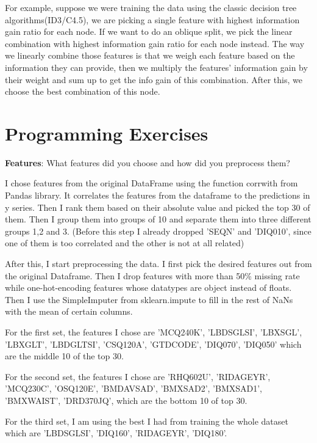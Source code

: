 \documentclass{article}
\begin{document}
        For example, suppose we were training the data using the classic decision tree algorithms(ID3/C4.5), we are picking a single feature with highest information gain ratio for each node. If we want to do an oblique split, we pick the linear combination with highest information gain ratio for each node instead. The way we linearly combine those features is that we weigh each feature based on the information they can provide, then we multiply the features' information gain by their weight and sum up to get the info gain of this combination. After this, we choose the best combination of this node.
        
        
        \section{Programming Exercises}
        \textbf{Features}: What features did you choose and how did you preprocess them?
        
        I chose features from the original DataFrame using the function corrwith from Pandas library. It correlates the features from the dataframe to the predictions in y series. Then I rank them based on their absolute value and picked the top 30 of them.  Then I group them into groups of 10 and separate them into three different groups 1,2 and 3. (Before this step I already dropped 'SEQN' and 'DIQ010', since one of them is too correlated and the other is not at all related)
        
        After this, I start preprocessing the data. I first pick the desired features out from the original Dataframe. Then I drop features with more than 50\% missing rate while one-hot-encoding features whose datatypes are object instead of floats. Then I use the SimpleImputer from sklearn.impute to fill in the rest of NaNs with the mean of certain columns.
        
        For the first set, the features I chose are 'MCQ240K', 'LBDSGLSI', 'LBXSGL', 'LBXGLT', 'LBDGLTSI', 'CSQ120A', 'GTDCODE', 'DIQ070', 'DIQ050' which are the middle 10 of the top 30.
        
        For the second set, the features I chose are 'RHQ602U', 'RIDAGEYR', 'MCQ230C', 'OSQ120E', 'BMDAVSAD', 'BMXSAD2', 'BMXSAD1', 'BMXWAIST', 'DRD370JQ', which are the bottom 10 of top 30.
        
        For the third set, I am using the best I had from training the whole dataset which are 'LBDSGLSI', 'DIQ160', 'RIDAGEYR', 'DIQ180'.
        
\end{document}
